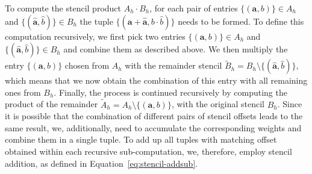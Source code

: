 To compute the stencil product $A_h \cdot B_h$, for each pair of entries $\{(\bm{a}, b ) \} \in A_h$ and $\{(\bm{\hat{a}}, \hat{b} ) \} \in B_h$ the tuple $\{(\bm{a} + \bm{\hat{a}}, b \cdot \hat{b} ) \}$ needs to be formed.
To define this computation recursively, we first pick two entries $\{(\bm{a}, b ) \} \in A_h$ and $\{(\bm{\hat{a}}, \hat{b} ) \} \in B_h$ and combine them as described above.
We then multiply the entry $\{(\bm{a}, b ) \}$ chosen from $A_h$ with the remainder stencil $\tilde{B}_h = B_h \setminus \{(\bm{\hat{a}}, \hat{b} ) \}$, which means that we now obtain the combination of this entry with all remaining ones from $B_h$.
Finally, the process is continued recursively by computing the product of the remainder $\tilde{A}_h = A_h \setminus \{(\bm{a}, b ) \}$, with the original stencil $B_h$.
Since it is possible that the combination of different pairs of stencil offsets leads to the same result, we, additionally, need to accumulate the corresponding weights and combine them in a single tuple.
To add up all tuples with matching offset obtained within each recursive sub-computation, we, therefore, employ stencil addition, as defined in Equation~\eqref{eq:stencil-addsub}.
